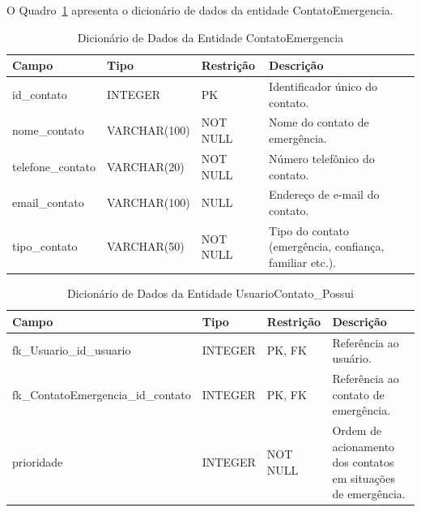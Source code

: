 O Quadro~\ref{quad_contato} apresenta o dicionário de dados da entidade ContatoEmergencia.

\begin{table}[H]
\caption{Dicionário de Dados da Entidade ContatoEmergencia}
\label{quad_contato}
\centering
\footnotesize

\begin{tabular}{|p{3cm}|p{2.5cm}|p{4cm}|p{5cm}|}
\hline
\textbf{Campo} & \textbf{Tipo} & \textbf{Restrição} & \textbf{Descrição} \\
\hline

id\_contato & INTEGER & PK & Identificador único do contato. \\
\hline

nome\_contato & VARCHAR(100) & NOT NULL & Nome do contato de emergência. \\
\hline

telefone\_contato & VARCHAR(20) & NOT NULL & Número telefônico do contato. \\
\hline

email\_contato & VARCHAR(100) & NULL & Endereço de e-mail do contato. \\
\hline

tipo\_contato & VARCHAR(50) & NOT NULL & Tipo do contato (emergência, confiança, familiar etc.). \\
\hline

\end{tabular}

\normalsize

\end{table}

\begin{table}[H]
\caption{Dicionário de Dados da Entidade UsuarioContato\_Possui}
\label{quad_usuario_contato}
\centering
\footnotesize

\begin{tabular}{|p{}|p{2cm}|p{2.5cm}|p{}|}
\hline
\textbf{Campo} & \textbf{Tipo} & \textbf{Restrição} & \textbf{Descrição} \\
\hline

fk\_Usuario\_id\_usuario & INTEGER & PK, FK & Referência ao usuário. \\
\hline

fk\_ContatoEmergencia\_id\_contato & INTEGER & PK, FK & Referência ao contato de emergência. \\
\hline

prioridade & INTEGER & NOT NULL & Ordem de acionamento dos contatos em situações de emergência. \\
\hline

\end{tabular}

\normalsize

\end{table}

